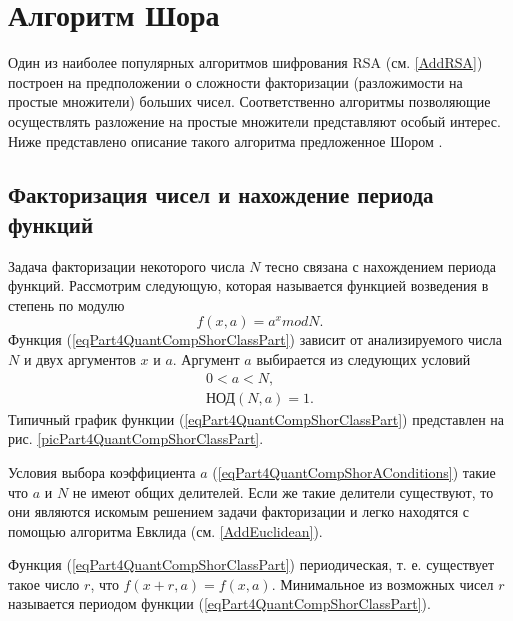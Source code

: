 \section{Алгоритм Шора}
\label{Part4QuantCompShor}
Один из наиболее популярных алгоритмов шифрования RSA (см. 
\autoref{AddRSA}) 
построен на предположении о сложности факторизации
(разложимости на простые множители) больших чисел. Соответственно
алгоритмы позволяющие осуществлять разложение на простые множители
представляют особый интерес. Ниже представлено описание такого
алгоритма предложенное Шором \cite{bShor94}.

\subsection{Факторизация чисел и нахождение периода функций}
Задача факторизации некоторого числа $N$ тесно связана с нахождением периода
функций. Рассмотрим следующую, которая называется функцией возведения
в степень по модулю
\begin{equation}
f\left(x, a\right) = a^x mod N.
\label{eqPart4QuantCompShorClassPart}
\end{equation}
Функция (\ref{eqPart4QuantCompShorClassPart}) зависит от
анализируемого числа $N$ и двух аргументов $x$ и $a$. Аргумент $a$
выбирается из следующих условий
\begin{eqnarray}
0 < a < N,
\nonumber \\
\mbox{НОД}\left(N, a\right) = 1.
\label{eqPart4QuantCompShorAConditions}
\end{eqnarray}
Типичный график функции (\ref{eqPart4QuantCompShorClassPart}) представлен на
рис. \ref{picPart4QuantCompShorClassPart}.




Условия выбора коэффициента $a$
(\ref{eqPart4QuantCompShorAConditions}) такие что $a$ и $N$ не имеют
общих делителей. Если же такие делители существуют, то они являются
искомым решением задачи факторизации и легко находятся с помощью
алгоритма Евклида (см. \autoref{AddEuclidean}).

Функция (\ref{eqPart4QuantCompShorClassPart}) периодическая,
т. е. существует такое число $r$, что $f\left(x + r, a\right) = 
f\left(x, a\right)$. Минимальное из возможных чисел $r$ называется
периодом функции (\ref{eqPart4QuantCompShorClassPart}). 

